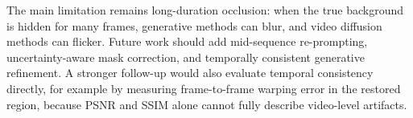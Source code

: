 \documentclass[10pt,twocolumn,letterpaper]{article}
\begin{document}
The main limitation remains long-duration occlusion: when the true background is hidden for many frames, generative methods can blur, and video diffusion methods can flicker. Future work should add mid-sequence re-prompting, uncertainty-aware mask correction, and temporally consistent generative refinement. A stronger follow-up would also evaluate temporal consistency directly, for example by measuring frame-to-frame warping error in the restored region, because PSNR and SSIM alone cannot fully describe video-level artifacts.

\clearpage
{\small


}
\end{document}
